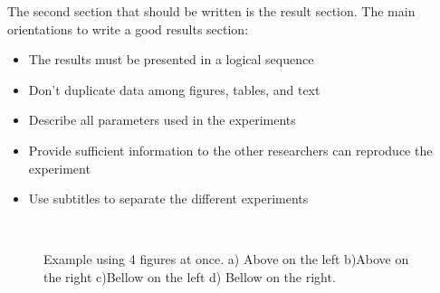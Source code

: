 \documentclass[twoside,letterpaper,twocolumn]{article}
\begin{document}
The second section that should be written is the result section. The main orientations to write a good results section:

\begin{itemize}
	\item The results must be presented in a logical sequence
	\item Don't duplicate data among figures, tables, and text
	\item Describe all parameters used in the experiments
	\item Provide sufficient information to the other researchers can reproduce the experiment
	\item Use subtitles to separate the different experiments
	
\end{itemize}


\begin{figure}[h!]
	\centering
	\\
	\caption{ Example using 4 figures at once. a) Above on the left b)Above on the right  c)Bellow on the left d) Bellow on the right.}
	\label{fig:label9}
\end{figure}
\end{document}
